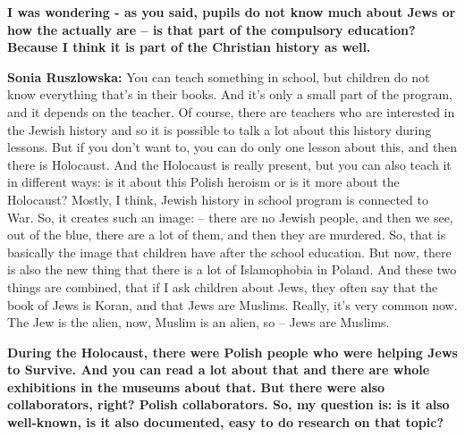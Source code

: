 \textbf{I was wondering - as you said, pupils do not know much about Jews or how the actually are – is that part of the compulsory education? Because I think it is part of the Christian history as well.} 

\textbf{Sonia Ruszlowska:} You can teach something in school, but children do not know everything that’s in their books. And it’s only a small part of the program, and it depends on the teacher. Of course, there are teachers who are interested in the Jewish history and so it is possible to talk a lot about this history during lessons. But if you don’t want to, you can do only one lesson about this, and then there is Holocaust. And the Holocaust is really present, but you can also teach it in different ways: is it about this Polish heroism or is it more about the Holocaust? Mostly, I think, Jewish history in school program is connected to War. So, it creates such an image: – there are no Jewish people, and then we see, out of the blue, there are a lot of them, and then they are murdered. So, that is basically the image that children have after the school education. But now, there is also the new thing that there is a lot of Islamophobia in Poland. And these two things are combined, that if I ask children about Jews, they often say that the book of Jews is Koran, and that Jews are Muslims. Really, it’s very common now. The Jew is the alien, now, Muslim is an alien, so – Jews are Muslims.  

\textbf{During the Holocaust, there were Polish people who were helping Jews to Survive. And you can read a lot about that and there are whole exhibitions in the museums about that. But there were also collaborators, right? Polish collaborators. So, my question is: is it also well-known, is it also documented, easy to do research on that topic?} 

